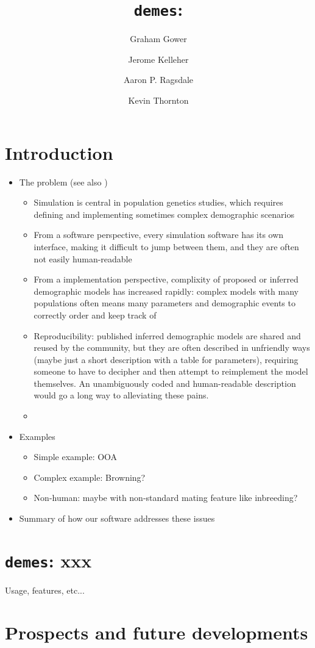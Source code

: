 \documentclass{article}
\newcommand{\demes}[0]{\texttt{demes}}
\begin{document}
\title{\demes: }
\author[1]{Graham Gower}
\author[1]{Jerome Kelleher}
\author[1]{Aaron P. Ragsdale}
\author[1]{Kevin Thornton}
\maketitle

\abstract{
}

\section*{Introduction}

\begin{itemize}
  \item The problem (see also \citet{ragsdale2020lessons})
  \begin{itemize}
    \item Simulation is central in population genetics studies, which requires defining
      and implementing sometimes complex demographic scenarios
    \item From a software perspective, every simulation software has its own interface,
      making it difficult to jump between them, and they are often not easily
      human-readable
    \item From a implementation perspective, complixity of proposed or inferred demographic
      models has increased rapidly: complex models with many populations often means
      many parameters and demographic events to correctly order and keep track of
    \item Reproducibility: published inferred demographic models are shared and reused
      by the community, but they are often described in unfriendly ways (maybe just a
      short description with a table for parameters), requiring someone to have to
      decipher and then attempt to reimplement the model themselves. An unambiguously
      coded and human-readable description would go a long way to alleviating these pains.
      \citep{adrion2020community}
    \item \citep{gutenkunst2009inferring,thornton2014c++,kelleher2016efficient,jouganous2017inferring}
  \end{itemize}
  \item Examples
  \begin{itemize}
    \item Simple example: OOA \citep{gutenkunst2009inferring,jouganous2017inferring}
    \item Complex example: Browning?
    \item Non-human: maybe with non-standard mating feature like inbreeding?
  \end{itemize}
  \item Summary of how our software addresses these issues
\end{itemize}

\section*{\demes: xxx}
Usage, features, etc...

\section*{Prospects and future developments}



\end{document}
